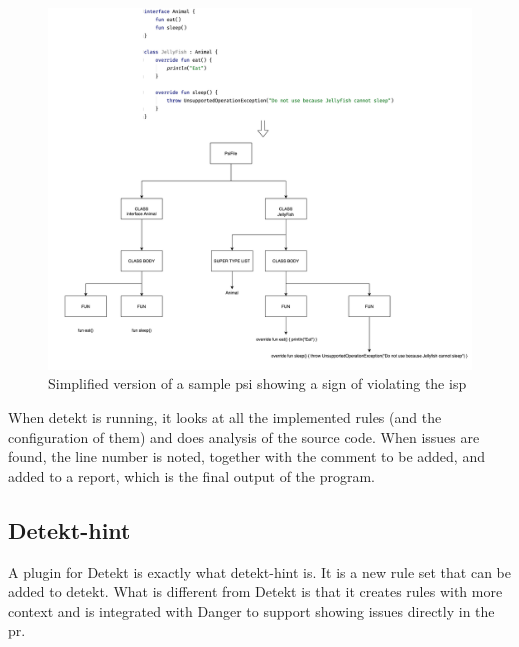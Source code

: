 \documentclass{report}
\begin{document}
\begin{figure}[h!]
    \centering
    \includegraphics[width=\linewidth]{report/images/psi.png}
    \caption{Simplified version of a sample \gls{psi} showing a sign of violating the \gls{isp}}
    \label{fig:psi}
\end{figure}

When detekt is running, it looks at all the implemented rules (and the configuration of them) and does analysis of the source code. When issues are found, the line number is noted, together with the comment to be added, and added to a report, which is the final output of the program. 

\subsection{Detekt-hint}
A plugin for Detekt is exactly what detekt-hint is. It is a new rule set that can be added to detekt. What is different from Detekt is that it creates rules with more context and is integrated with Danger to support showing issues directly in the \gls{pr}.
\end{document}
